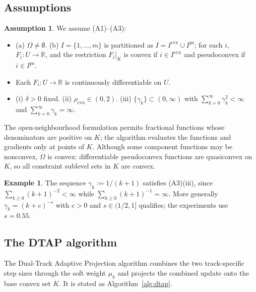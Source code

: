 \documentclass[]{interact}
\theoremstyle{plain}
\theoremstyle{definition}
\newtheorem{example}[theorem]{Example}
\newtheorem{assumption}{Assumption}
\theoremstyle{remark}
\newcommand{\R}{\mathbb{R}}
\newcommand{\cvx}{\mathrm{cvx}}
\newcommand{\ps}{\mathrm{ps}}
\begin{document}
\subsection{Assumptions}\label{ssec:assumptions}
\begin{assumption}\label{ass:standing}
We assume \textup{(A1)--(A3)}:
\begin{itemize}[leftmargin=2.4em,itemsep=2pt]
\item[\textup{(A1)}] \textup{(a)} $\Omega\ne\emptyset$. \textup{(b)} $I=\{1,\dots,m\}$
is partitioned as $I=I^{\cvx}\cup I^{\ps}$; for each $i$, $F_i:U\to\R$, and the
restriction $F_i|_K$ is convex if $i\in I^{\cvx}$ and pseudoconvex if $i\in I^{\ps}$.
\item[\textup{(A2)}] Each $F_i:U\to\R$ is continuously differentiable on $U$.
\item[\textup{(A3)}] \textup{(i)} $\delta>0$ fixed. \textup{(ii)}
$\rho_{\cvx}\in(0,2)$. \textup{(iii)} $\{\gamma_k\}\subset(0,\infty)$ with
$\sum_{k=0}^\infty\gamma_k^2<\infty$ and $\sum_{k=0}^\infty\gamma_k=\infty$.
\end{itemize}
\end{assumption}
The open-neighbourhood formulation permits fractional functions whose denominators are
positive on $K$; the algorithm evaluates the functions and gradients only at points of $K$.
Although some component functions may be nonconvex, $\Omega$ is convex: differentiable
pseudoconvex functions are quasiconvex on $K$, so all constraint sublevel sets in $K$ are convex.
\begin{example}\label{ex:gamma}
The sequence $\gamma_k:=1/(k+1)$ satisfies (A3)(iii), since $\sum_{k\ge0}(k+1)^{-2}<\infty$
while $\sum_{k\ge0}(k+1)^{-1}=\infty$. More generally $\gamma_k=(k+c)^{-s}$ with $c>0$
and $s\in(1/2,1]$ qualifies; the experiments use $s=0.55$.
\end{example}

\subsection{The DTAP algorithm}\label{ssec:algorithm}
The Dual-Track Adaptive Projection algorithm combines the two track-specific step sizes
through the soft weight $\mu_k$ and projects the combined update onto the base convex
set $K$. It is stated as Algorithm~\ref{alg:dtap}.
\end{document}
